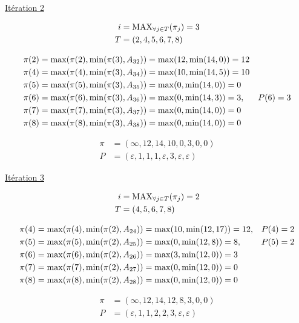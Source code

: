 \documentclass{article}
\begin{document}
\underline{Itération 2}

\begin{align*}
  i &= \operatorname{MAX}_{\forall j \in T}(\pi_j) = 3\\
  T &= (2,4,5,6,7,8)
\end{align*}

\begin{align*}
  &\pi(2) = \operatorname{max}(\pi(2), \operatorname{min}(\pi(3), A_{32})) = \operatorname{max}(12, \operatorname{min}(14,0)) = 12\\
  &\pi(4) = \operatorname{max}(\pi(4), \operatorname{min}(\pi(3), A_{34})) = \operatorname{max}(10, \operatorname{min}(14,5)) = 10\\
  &\pi(5) = \operatorname{max}(\pi(5), \operatorname{min}(\pi(3), A_{35})) = \operatorname{max}(0, \operatorname{min}(14,0)) = 0\\
  &\pi(6) = \operatorname{max}(\pi(6), \operatorname{min}(\pi(3), A_{36})) = \operatorname{max}(0, \operatorname{min}(14,3)) = 3, &P(6) = 3\\
  &\pi(7) = \operatorname{max}(\pi(7), \operatorname{min}(\pi(3), A_{37})) = \operatorname{max}(0, \operatorname{min}(14,0)) = 0\\
  &\pi(8) = \operatorname{max}(\pi(8), \operatorname{min}(\pi(3), A_{38})) = \operatorname{max}(0, \operatorname{min}(14,0)) = 0
\end{align*}

\begin{align*}
  \pi &= (\infty,12,14,10,0,3,0,0)\\
  P &= (\varepsilon, 1, 1, 1, \varepsilon, 3, \varepsilon, \varepsilon)
\end{align*}

\underline{Itération 3}

\begin{align*}
  i &= \operatorname{MAX}_{\forall j \in T}(\pi_j) = 2\\
  T &= (4,5,6,7,8)
\end{align*}

\begin{align*}
  &\pi(4) = \operatorname{max}(\pi(4), \operatorname{min}(\pi(2), A_{24})) = \operatorname{max}(10, \operatorname{min}(12,17)) = 12, &P(4) = 2\\
  &\pi(5) = \operatorname{max}(\pi(5), \operatorname{min}(\pi(2), A_{25})) = \operatorname{max}(0, \operatorname{min}(12,8)) = 8, &P(5) = 2\\
  &\pi(6) = \operatorname{max}(\pi(6), \operatorname{min}(\pi(2), A_{26})) = \operatorname{max}(3, \operatorname{min}(12,0)) = 3\\
  &\pi(7) = \operatorname{max}(\pi(7), \operatorname{min}(\pi(2), A_{27})) = \operatorname{max}(0, \operatorname{min}(12,0)) = 0\\
  &\pi(8) = \operatorname{max}(\pi(8), \operatorname{min}(\pi(2), A_{28})) = \operatorname{max}(0, \operatorname{min}(12,0)) = 0
\end{align*}

\begin{align*}
  \pi &= (\infty,12,14,12,8,3,0,0)\\
  P &= (\varepsilon, 1, 1, 2, 2, 3, \varepsilon, \varepsilon)
\end{align*}
\end{document}
